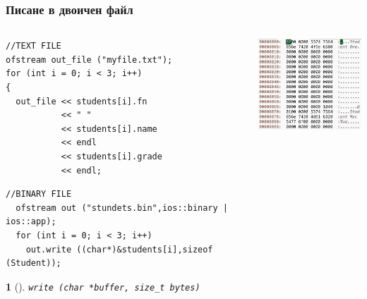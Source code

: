 \documentclass{beamer}
\newtheorem*{remark}{}
\begin{document}
\begin{frame}[fragile]
\frametitle{Писане в двоичен файл}



\begin{columns}[t]
  \begin{column}{0.6\textwidth}
      \begin{flushleft}
      \begin{lstlisting}
//TEXT FILE
ofstream out_file ("myfile.txt");
for (int i = 0; i < 3; i++)
{
  out_file << students[i].fn 
           << " "
           << students[i].name 
           << endl 
           << students[i].grade 
           << endl;
      \end{lstlisting}
\begin{lstlisting}
//BINARY FILE
  ofstream out ("stundets.bin",ios::binary | ios::app);
  for (int i = 0; i < 3; i++)
    out.write ((char*)&students[i],sizeof (Student));

      \end{lstlisting}
\begin{remark}[]
    \texttt{write (char *buffer, size\_t bytes)}
\end{remark}      
      \end{flushleft} 
  \end{column}
  \begin{column}{0.4\textwidth}

  \includegraphics[width=4.5cm]{images/binfiless}
  \end{column}
\end{columns}
\end{frame}
\end{document}
